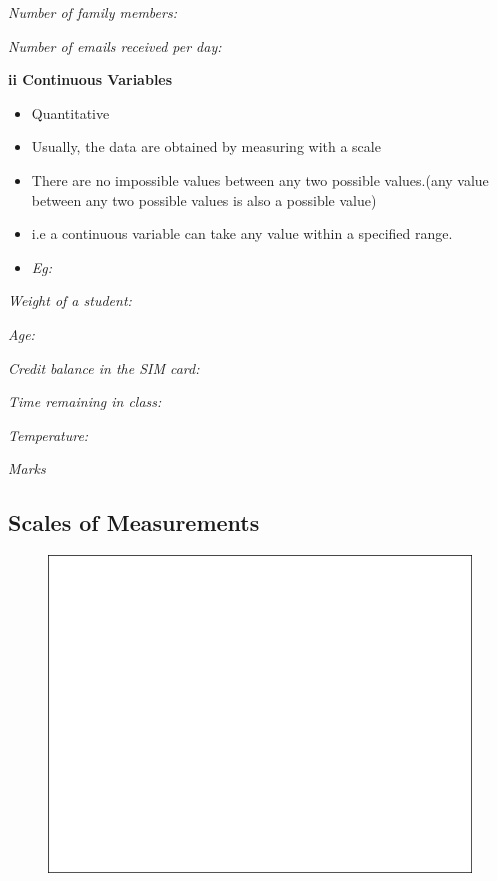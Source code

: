 \documentclass[]{book}
\providecommand{\tightlist}{%
  \setlength{\itemsep}{0pt}\setlength{\parskip}{0pt}}
\begin{document}
\emph{Number of family members:}

\emph{Number of emails received per day:}

\textbf{ii Continuous Variables}

\begin{itemize}
\tightlist
\item
  Quantitative
\item
  Usually, the data are obtained by measuring with a scale
\item
  There are no impossible values between any two possible values.(any value between any two possible values is also a possible value)
\item
  i.e a continuous variable can take any value within a specified range.
\item
  \emph{Eg:}
\end{itemize}

\emph{Weight of a student:}

\emph{Age:}

\emph{Credit balance in the SIM card:}

\emph{Time remaining in class:}

\emph{Temperature:}

\emph{Marks}

\hypertarget{scales-of-measurements}{%
\subsection{Scales of Measurements}\label{scales-of-measurements}}

\begin{figure}

{\centering \includegraphics[width=1\linewidth]{figure/box3-1} 

}

\end{figure}
\end{document}
